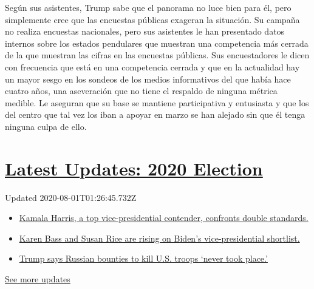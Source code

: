 Según sus asistentes, Trump sabe que el panorama no luce bien para él,
pero simplemente cree que las encuestas públicas exageran la situación.
Su campaña no realiza encuestas nacionales, pero sus asistentes le han
presentado datos internos sobre los estados pendulares que muestran una
competencia más cerrada de la que muestran las cifras en las encuestas
públicas. Sus encuestadores le dicen con frecuencia que está en una
competencia cerrada y que en la actualidad hay un mayor sesgo en los
sondeos de los medios informativos del que había hace cuatro años, una
aseveración que no tiene el respaldo de ninguna métrica medible. Le
aseguran que su base se mantiene participativa y entusiasta y que los
del centro que tal vez los iban a apoyar en marzo se han alejado sin que
él tenga ninguna culpa de ello.

\hypertarget{latest-updates-2020-election}{%
\section{\texorpdfstring{\href{https://www.nytimes.com/2020/07/31/us/elections/biden-vs-trump.html?action=click\&pgtype=Article\&state=default\&region=MAIN_CONTENT_1\&context=storylines_live_updates}{Latest
Updates: 2020
Election}}{Latest Updates: 2020 Election}}\label{latest-updates-2020-election}}

Updated 2020-08-01T01:26:45.732Z

\begin{itemize}
\tightlist
\item
  \href{https://www.nytimes.com/2020/07/31/us/elections/biden-vs-trump.html?action=click\&pgtype=Article\&state=default\&region=MAIN_CONTENT_1\&context=storylines_live_updates\#link-29fdff45}{Kamala
  Harris, a top vice-presidential contender, confronts double
  standards.}
\item
  \href{https://www.nytimes.com/2020/07/31/us/elections/biden-vs-trump.html?action=click\&pgtype=Article\&state=default\&region=MAIN_CONTENT_1\&context=storylines_live_updates\#link-13ec3d9c}{Karen
  Bass and Susan Rice are rising on Biden's vice-presidential
  shortlist.}
\item
  \href{https://www.nytimes.com/2020/07/31/us/elections/biden-vs-trump.html?action=click\&pgtype=Article\&state=default\&region=MAIN_CONTENT_1\&context=storylines_live_updates\#link-49e9a016}{Trump
  says Russian bounties to kill U.S. troops `never took place.'}
\end{itemize}

\href{https://www.nytimes.com/2020/07/31/us/elections/biden-vs-trump.html?action=click\&pgtype=Article\&state=default\&region=MAIN_CONTENT_1\&context=storylines_live_updates}{See
more updates}

